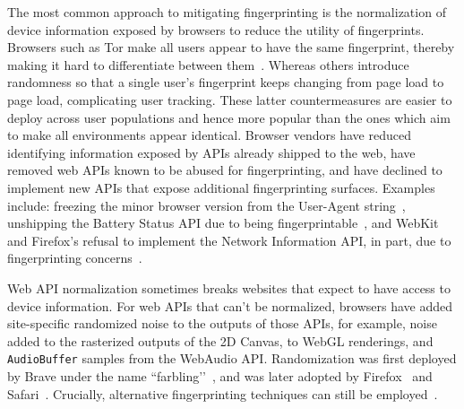 The most common approach to mitigating fingerprinting is the normalization of device information exposed by browsers to reduce the utility of fingerprints. 
%
Browsers such as Tor make all users appear to have the same fingerprint, thereby making it hard to differentiate between them~\cite{perryDesignImplementationTor2013}. 
%
Whereas others introduce randomness so that a single user's fingerprint keeps changing from page load to page load, complicating user tracking. 
%
These latter countermeasures are easier to deploy across user populations and hence more popular than the ones which aim to make all environments appear identical.
%
Browser vendors have reduced identifying information exposed by APIs already shipped to the web, have removed web APIs known to be abused for fingerprinting, and have declined to implement new APIs that expose additional fingerprinting surfaces. 
Examples include: freezing the minor browser version from the User-Agent string~\cite{weissIntentDeprecateFreeze2020}, unshipping the Battery Status API due to being fingerprintable~\cite{olejnikBatteryStatusNot2017}, and WebKit and Firefox’s refusal to implement the Network Information API, in part, due to fingerprinting concerns~\cite{TrackingPreventionWebKit2020, thomsonNetworkInformationAPI2018}.


%
Web API normalization sometimes breaks websites that expect to have access to device information. 
%
%
For web APIs that can’t be normalized, browsers have added site-specific randomized noise to the outputs of those APIs, for example, noise added to the rasterized outputs of the 2D Canvas, to WebGL renderings, and \texttt{AudioBuffer} samples from the WebAudio API. 
%
Randomization was first deployed by Brave under the name ``farbling’’~\cite{braveprivacyteamFingerprintingDefenses202020}, and was later adopted by Firefox~\cite{huang1816056FprandomizationMeta2023} and Safari~\cite{wilanderPrivateBrowsing202024}. Crucially, alternative fingerprinting techniques can still be employed~\cite{linFashionFauxPas2023}.


